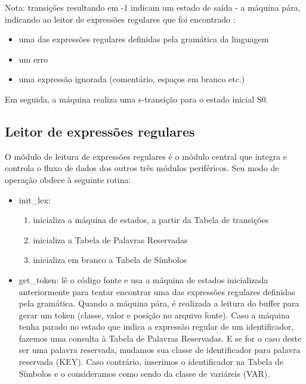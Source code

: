 Nota: transições resultando em -1 indicam um estado de saída - a máquina pára, indicando ao leitor de expressões regulares que foi encontrado :

\begin{itemize}
	\item uma das expressões regulares definidas pela gramática da linguagem 
	\item um erro
	\item uma expressão ignorada (comentário, espaços em branco etc.)
\end{itemize}

Em seguida, a máquina realiza uma $\epsilon$-transição para o estado inicial S0.

\subsection{Leitor de expressões regulares}

O módulo de leitura de expressões regulares é o módulo central que integra e controla o fluxo de dados dos outros três módulos periféricos. Seu modo de operação obdece à seguinte rotina:

\begin{itemize}
	\item init\_lex:

	\begin{enumerate}
		\item inicializa a máquina de estados, a partir da Tabela de transições
		\item inicializa a Tabela de Palavras Reservadas
		\item inicializa em branco a Tabela de Símbolos
	\end{enumerate}

	\item get\_token: lê o código fonte e usa a máquina de estados inicializada anteriormente para tentar encontrar uma das expressões regulares definidas pela gramática. Quando a máquina pára, é realizada a leitura do buffer para gerar um token (classe, valor e posição no arquivo fonte). Caso a máquina tenha parado no estado que indica a expressão regular de um identificador, fazemos uma consulta à Tabela de Palavras Reservadas. E se for o caso deste ser uma palavra reservada, mudamos sua classe de identificador para palavra reservada (KEY). Caso contrário, inserimos o identificador na Tabela de Símbolos e o consideramos como sendo da classe de variáreis (VAR).
\end{itemize}

